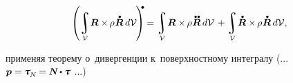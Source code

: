 \begin{otherlanguage}{russian}
\nopagebreak\vspace{-0.2em}\begin{equation*}
\displaystyle\left( \integral\displaylimits_{\mathcal{V}} \hspace{-0.4ex} \bm{R} \times \hspace{-0.2ex} \rho \hspace{.1ex} \mathdotabove{\bm{R}} \hspace{.4ex} d\mathcal{V} \hspace{-0.2ex} \right)^{\hspace{-0.32em}\tikz[baseline=-0.2ex]\draw[black, fill=black] (0,0) circle (.28ex);} \hspace{-0.1ex}
=
\integral\displaylimits_{\mathcal{V}} \hspace{-0.32ex} \bm{R} \times \hspace{-0.2ex} \rho \hspace{.1ex} \mathdotdotabove{\bm{R}} \hspace{.4ex} d\mathcal{V}
\hspace{.3ex} +
\integral\displaylimits_{\mathcal{V}} \hspace{-0.32ex} \tikzmark{RdotCrossRdotBegin} \mathdotabove{\bm{R}} \times \hspace{-0.2ex} \rho \hspace{.1ex} \mathdotabove{\bm{R}} \hspace{.1ex} \tikzmark{RdotCrossRdotEnd} \hspace{.3ex} d\mathcal{V} ,
\end{equation*}

\vspace{-0.6em}
\noindent применяя теорему о~дивергенции к~поверхностному интегралу
(... ${\bm{p} = \hspace{-0.1ex} \tractionvector{N} \hspace{-0.1ex} = \mathboldN \dotp \cauchystress}$ ...)


\end{otherlanguage}
